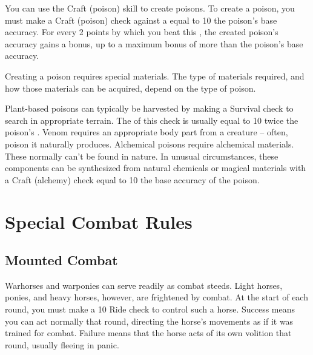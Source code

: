         You can use the Craft (poison) skill to create poisons.
        To create a poison, you must make a Craft (poison) check against a  equal to 10 \add the poison's base accuracy.
        For every 2 points by which you beat this , the created poison's accuracy gains a  bonus, up to a maximum bonus of  more than the poison's base accuracy.

        Creating a poison requires special materials.
        The type of materials required, and how those materials can be acquired, depend on the type of poison.

        \begin{itemize}
             Plant-based poisons can typically be harvested by making a Survival check to search in appropriate terrain.
                The  of this check is usually equal to 10 \add twice the poison's .
             Venom requires an appropriate body part from a creature -- often, poison it naturally produces.
             Alchemical poisons require alchemical materials.
                These normally can't be found in nature.
                In unusual circumstances, these components can be synthesized from natural chemicals or magical materials with a Craft (alchemy) check equal to 10 \add the base accuracy of the poison.
        \end{itemize}

\section{Special Combat Rules}

    \subsection{Mounted Combat}\label{Mounted Combat}
         Warhorses and warponies can serve readily as combat steeds. Light horses, ponies, and heavy horses, however, are frightened by combat.
        At the start of each round, you must make a  10 Ride check to control such a horse.
        Success means you can act normally that round, directing the horse's movements as if it was trained for combat.
        Failure means that the horse acts of its own volition that round, usually fleeing in panic.

